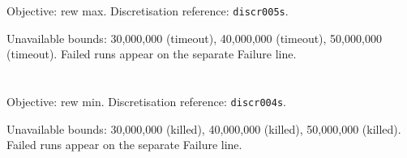 \documentclass[a4paper,10pt]{article}
\begin{document}
\noindent\begin{minipage}{\linewidth}
\section*{\small\texttt{}}
Objective: rew max. Discretisation reference: \texttt{discr005s}.

\begin{minipage}[t]{0.48\linewidth}\centering

\end{minipage}
\hfill
\begin{minipage}[t]{0.48\linewidth}\centering

\end{minipage}
\par\medskip
Unavailable bounds: 30,000,000 (timeout), 40,000,000 (timeout), 50,000,000 (timeout). Failed runs appear on the separate Failure line.

\end{minipage}\par\bigskip
\clearpage
\noindent\begin{minipage}{\linewidth}
\section*{\small\texttt{}}
Objective: rew min. Discretisation reference: \texttt{discr004s}.

\begin{minipage}[t]{0.48\linewidth}\centering

\end{minipage}
\hfill
\begin{minipage}[t]{0.48\linewidth}\centering

\end{minipage}
\par\medskip
Unavailable bounds: 30,000,000 (killed), 40,000,000 (killed), 50,000,000 (killed). Failed runs appear on the separate Failure line.

\end{minipage}\par\bigskip
\end{document}
